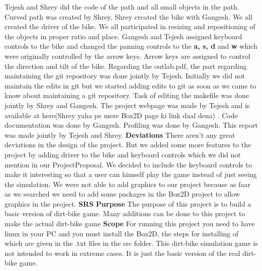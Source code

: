 \documentclass[17pt, a4paper]{extarticle}
\begin{document}
Tejesh and Shrey did the code of the path and all small objects in the path. Curved path was created by Shrey. Shrey created the bike with Gangesh. We all created the driver of the bike. We all participated in resizing and repositioning of the objects in proper ratio and place. Gangesh and Tejesh assigned keyboard controls to the bike and changed the panning controls to the \textbf {a, s, d} and \textbf {w} which were originally controlled by the arrow keys. Arrow keys are assigned to control the direction and tilt of the bike.
\newline
Regarding the outlab.pdf, the part regarding maintaining the git repository was done jointly by Tejesh. Initially we did not maintain the edits in git but we started adding edits to git as soon as we came to know about maintaining a git repository. Task of editing the makefile was done jointly by Shrey and Gangesh. The project webpage was made by Tejesh and is available at here(Shrey yaha pe mere Box2D page ki link daal dena) . Code documentation was done by Gangesh. Profiling was done by Gangesh. This report was made jointly by Tejesh and Shrey.
\newpage
\color{red} 
\textbf{Deviations}\newline
\newline
\color{black}
There aren't any great deviations in the design of the project. But we added some more features to the project by adding driver to the bike and keyboard controls which we did not mention in our ProjectProposal.
\newline
We decided to include the keyboard controls to make it interesting so that a user can himself play the game instead of just seeing the simulation.
\newline
We were not able to add graphics to our project because as faar as we searched we need to add some packages in the Box2D project to allow graphics in the project.
\newpage
\color{red} 
\textbf{SRS}\newline
\newline
\newline
\color{blue}
\textbf{Purpose}\newline
\color{black}
The purpose of this project is to build a basic version of dirt-bike game. Many additions can be done to this project to make the actual dirt-bike game
\newline
\newline
\color{blue}
\textbf{Scope}\newline
\color{black}
For running this project you need to have linux in your PC and you must install the Box2D, the steps for installing of which are given in the .txt files in the src folder. This dirt-bike simulation game is not intended to work in extreme cases. It is just the basic version of the real dirt-bike game.
\end{document}

